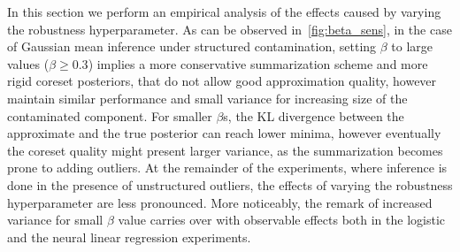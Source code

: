 In this section we perform an empirical analysis of the effects caused by varying the robustness hyperparameter. As can be observed in~\cref{fig:beta_sens}, in the case of Gaussian mean inference under structured contamination, setting $\beta$ to large values ($\beta \geq 0.3$) implies a more conservative summarization scheme and more rigid coreset posteriors, that do not allow good approximation quality, however maintain similar performance and small variance for increasing size of the contaminated component. For smaller $\beta$s, the KL divergence between the approximate and the true posterior can reach lower minima, however eventually the coreset quality might present larger variance, as the summarization becomes prone to adding outliers. At the remainder of the experiments, where inference is done in the presence of unstructured outliers, the effects of varying the robustness hyperparameter are less pronounced. More noticeably, the remark of increased variance for small $\beta$ value carries over with observable effects both in the logistic and the neural linear regression experiments.


